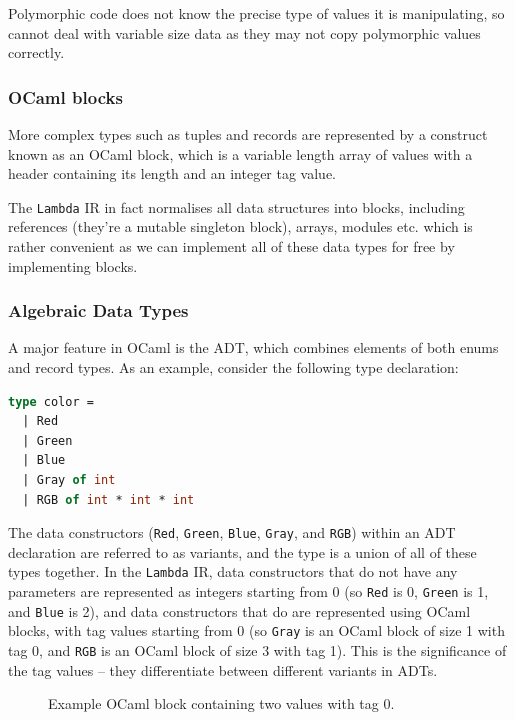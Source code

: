 Polymorphic code does not know the precise type of values it is manipulating, so
cannot deal with variable size data as they may not copy polymorphic values
correctly.

\subsubsection{OCaml blocks}

More complex types such as tuples and records are represented by a construct
known as an OCaml block, which is a variable length array of values with a
header containing its length and an integer tag value.

The \texttt{Lambda} IR in fact normalises all data structures into blocks, 
including references (they're a mutable singleton block), arrays, modules etc. 
which is rather convenient as we can implement all of these data types for free 
by implementing blocks.

\subsubsection{Algebraic Data Types}

A major feature in OCaml is the ADT, which combines elements of both enums and
record types. As an example, consider the following type declaration:

\begin{lstlisting}[language=Caml]
type color =
  | Red
  | Green
  | Blue
  | Gray of int
  | RGB of int * int * int
\end{lstlisting}

The data constructors (\texttt{Red}, \texttt{Green}, \texttt{Blue},
\texttt{Gray}, and \texttt{RGB}) within an ADT declaration are referred to as
variants, and the type is a union of all of these types together. In the
\texttt{Lambda} IR, data constructors that do not have any parameters are
represented as integers starting from 0 (so \texttt{Red} is 0, \texttt{Green} is
1, and \texttt{Blue} is 2), and data constructors that do are represented using
OCaml blocks, with tag values starting from 0 (so \texttt{Gray} is an OCaml
block of size 1 with tag 0, and \texttt{RGB} is an OCaml block of size 3 with
tag 1). This is the significance of the tag values -- they differentiate
between different variants in ADTs.

\begin{figure}
    \centering
    
    \caption{Example OCaml block containing two values with tag 0.}\label{fig:block-header}
\end{figure}

